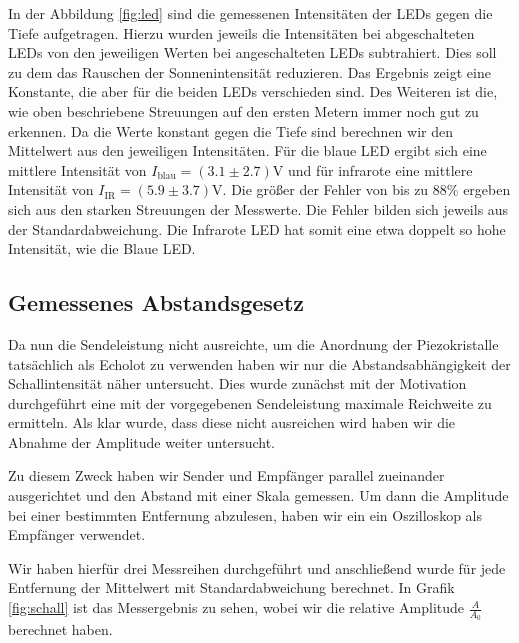 \documentclass[12pt,a4paper,titlepage,headinclude,bibtotoc]{scrartcl}
\numberwithin{equation}{subsection}
\begin{document}
In der Abbildung \ref{fig:led} sind die gemessenen Intensitäten der LEDs gegen die Tiefe aufgetragen.
Hierzu wurden jeweils die Intensitäten bei abgeschalteten LEDs von den jeweiligen Werten bei angeschalteten LEDs subtrahiert.
Dies soll zu dem das Rauschen der Sonnenintensität reduzieren.%
Das Ergebnis zeigt eine Konstante, die aber für die beiden LEDs verschieden sind.
Des Weiteren ist die, wie oben beschriebene Streuungen auf den ersten Metern immer noch gut zu erkennen.
Da die Werte konstant gegen die Tiefe sind berechnen wir den Mittelwert aus den jeweiligen Intensitäten.
Für die blaue LED ergibt sich eine mittlere Intensität von $I_\text{blau}=(3.1\pm2.7)\si{\volt}$ und für infrarote eine mittlere Intensität von $I_\text{IR}=(5.9\pm3.7)\si{\volt}$.
Die größer der Fehler von bis zu 88\% ergeben sich aus den starken Streuungen der Messwerte.
Die Fehler bilden sich jeweils aus der Standardabweichung.
Die Infrarote LED hat somit eine etwa doppelt so hohe Intensität, wie die Blaue LED.

\subsection{Gemessenes Abstandsgesetz}
Da nun die Sendeleistung nicht ausreichte, um die Anordnung der Piezokristalle tatsächlich als Echolot zu verwenden haben wir nur die Abstandsabhängigkeit der Schallintensität näher untersucht. 
Dies wurde zunächst mit der Motivation durchgeführt eine mit der vorgegebenen Sendeleistung maximale Reichweite zu ermitteln. Als klar wurde, dass diese nicht ausreichen wird haben wir
die Abnahme der Amplitude weiter untersucht.

Zu diesem Zweck haben wir Sender und Empfänger parallel zueinander ausgerichtet und den Abstand mit einer Skala gemessen. Um dann die Amplitude bei einer bestimmten Entfernung abzulesen, haben wir ein
ein Oszilloskop als Empfänger verwendet.

Wir haben hierfür drei Messreihen durchgeführt und anschließend wurde für jede Entfernung der Mittelwert mit Standardabweichung berechnet. In Grafik \ref{fig:schall} ist das Messergebnis zu sehen, wobei wir die relative Amplitude $\frac{A}{A_0}$ berechnet haben.
\end{document}
